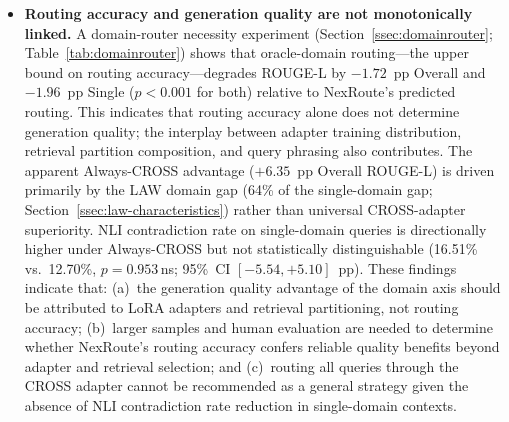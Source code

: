 \documentclass[a4paper,fleql,doubleblind]{cas-sc}
\begin{document}
\begin{itemize}
indicates that the architecture operates within a stable plateau ($< 0.7$~pp
variation) on the current evaluation set, though deployment in strongly
out-of-distribution environments may warrant further calibration. Two concrete directions address this. First, an evidence-aware router would
condition its domain and function decision not only on the query but also on
the distribution of retrieved candidate passages, performing a lightweight
evidence-alignment check before committing to a final routing decision.
Second, hard thresholds could be replaced with calibrated confidence
estimation---for example, temperature scaling validated via reliability
diagrams---so the system reports routing uncertainty rather than a binary
$(\tau, \delta)$ decision.
The current framework applies a single global $(\tau, \delta)$ pair across all
domains; domain-conditional thresholds could potentially recover STEM
routing accuracy without sacrificing CROSS recall, and are left to
future work.
A deeper limitation is that the current formulation (Eq.~\ref{eq:nexus_joint}) treats CROSS detection
as a post-hoc threshold rule rather than as part of a unified probabilistic model over
$\mathcal{D} \cup \{\texttt{CROSS}\}$; replacing this with a learned posterior
that assigns calibrated probability mass to the CROSS class directly
is an important direction for future work.
\item \textbf{Routing accuracy and generation quality are not monotonically linked.}
A domain-router necessity experiment (Section~\ref{ssec:domainrouter};
Table~\ref{tab:domainrouter}) shows that oracle-domain routing---the upper bound on
routing accuracy---degrades ROUGE-L by $-1.72$~pp Overall and $-1.96$~pp Single
($p{<}0.001$ for both) relative to NexRoute's predicted routing.
This indicates that routing accuracy alone does not determine generation quality;
the interplay between adapter training distribution, retrieval partition composition,
and query phrasing also contributes.
The apparent Always-CROSS advantage ($+6.35$~pp Overall ROUGE-L) is driven primarily
by the LAW domain gap (64\% of the single-domain gap; Section~\ref{ssec:law-characteristics})
rather than universal CROSS-adapter superiority.
NLI contradiction rate on single-domain queries is directionally higher under Always-CROSS
but not statistically distinguishable (16.51\% vs.\ 12.70\%, $p{=}0.953$\,\textsf{ns};
95\%~CI $[-5.54,{+}5.10]$~pp).
These findings indicate that: (a)~the generation quality advantage of the domain
axis should be attributed to LoRA adapters and retrieval partitioning, not routing
accuracy; (b)~larger samples and human evaluation are needed to determine whether
NexRoute's routing accuracy confers reliable quality benefits beyond adapter and
retrieval selection; and (c)~routing all queries through the CROSS adapter cannot
be recommended as a general strategy given the absence of NLI contradiction rate reduction
in single-domain contexts.


\end{itemize}
\end{document}

